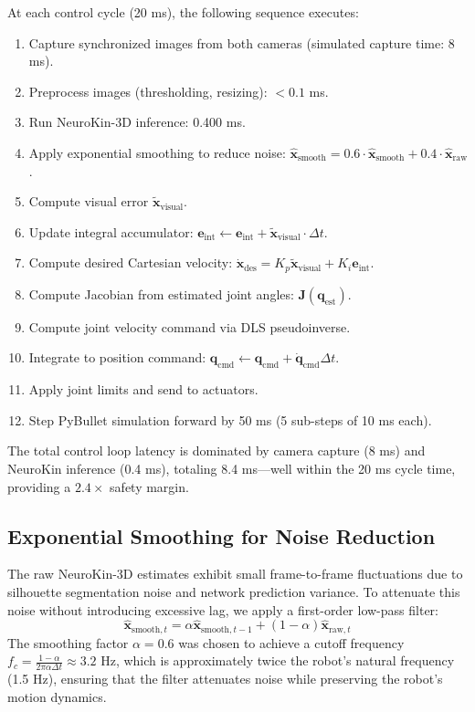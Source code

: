 \documentclass[12pt,a4paper,oneside]{report}
\begin{document}
At each control cycle (20 ms), the following sequence executes:
\begin{enumerate}
    \item Capture synchronized images from both cameras (simulated capture time: 8 ms).
    \item Preprocess images (thresholding, resizing): $<0.1$ ms.
    \item Run NeuroKin-3D inference: 0.400 ms.
    \item Apply exponential smoothing to reduce noise: $\hat{\mathbf{x}}_{\text{smooth}} = 0.6 \cdot \hat{\mathbf{x}}_{\text{smooth}} + 0.4 \cdot \hat{\mathbf{x}}_{\text{raw}}$.
    \item Compute visual error $\tilde{\mathbf{x}}_{\text{visual}}$.
    \item Update integral accumulator: $\mathbf{e}_{\text{int}} \leftarrow \mathbf{e}_{\text{int}} + \tilde{\mathbf{x}}_{\text{visual}} \cdot \Delta t$.
    \item Compute desired Cartesian velocity: $\dot{\mathbf{x}}_{\text{des}} = K_p \tilde{\mathbf{x}}_{\text{visual}} + K_i \mathbf{e}_{\text{int}}$.
    \item Compute Jacobian from estimated joint angles: $\mathbf{J}(\mathbf{q}_{\text{est}})$.
    \item Compute joint velocity command via DLS pseudoinverse.
    \item Integrate to position command: $\mathbf{q}_{\text{cmd}} \leftarrow \mathbf{q}_{\text{cmd}} + \dot{\mathbf{q}}_{\text{cmd}} \Delta t$.
    \item Apply joint limits and send to actuators.
    \item Step PyBullet simulation forward by 50 ms (5 sub-steps of 10 ms each).
\end{enumerate}

The total control loop latency is dominated by camera capture (8 ms) and NeuroKin inference (0.4 ms), totaling 8.4 ms---well within the 20 ms cycle time, providing a $2.4\times$ safety margin.

\subsection{Exponential Smoothing for Noise Reduction}

The raw NeuroKin-3D estimates exhibit small frame-to-frame fluctuations due to silhouette segmentation noise and network prediction variance. To attenuate this noise without introducing excessive lag, we apply a first-order low-pass filter:
\begin{equation}
\hat{\mathbf{x}}_{\text{smooth},t} = \alpha \hat{\mathbf{x}}_{\text{smooth},t-1} + (1 - \alpha) \hat{\mathbf{x}}_{\text{raw},t}
\end{equation}
The smoothing factor $\alpha = 0.6$ was chosen to achieve a cutoff frequency $f_c = \frac{1-\alpha}{2\pi \alpha \Delta t} \approx 3.2$ Hz, which is approximately twice the robot's natural frequency (1.5 Hz), ensuring that the filter attenuates noise while preserving the robot's motion dynamics.
\end{document}
